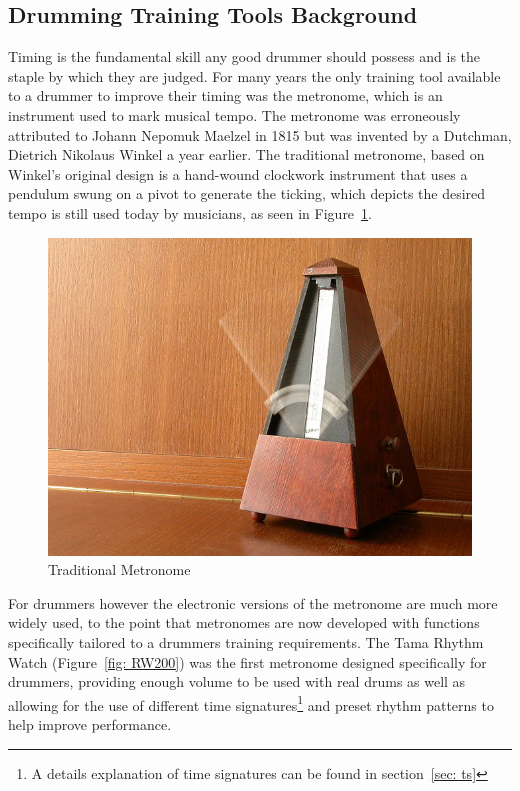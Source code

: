 \documentclass[a4paper, 11pt]{article}
\begin{document}
\subsection{Drumming Training Tools Background}
Timing is the fundamental skill any good drummer should possess and is the staple by which they are judged. For many years the only training tool available to a drummer to improve their timing was the metronome, which is an instrument used to mark musical tempo. The metronome was erroneously attributed to Johann Nepomuk Maelzel in 1815 but was invented by a Dutchman, Dietrich Nikolaus Winkel a year earlier. The traditional metronome, based on Winkel's original design is a hand-wound clockwork instrument that uses a pendulum swung on a pivot to generate the ticking, which depicts the desired tempo \cite{brit-metro} is still used today by musicians, as seen in Figure~\ref{fig: TradMet}. \par

\begin{figure}[ht]
	\centering
	\includegraphics[scale=0.25]{TradMet}
	\caption{Traditional Metronome}%
	\label{fig: TradMet}
\end{figure}

For drummers however the electronic versions of the metronome are much more widely used, to the point that metronomes are now developed with functions specifically tailored to a drummers training requirements. The Tama Rhythm Watch (Figure~\ref{fig: RW200}) was the first metronome designed specifically for drummers, providing enough volume to be used with real drums as well as allowing for the use of different time signatures\footnote{A details explanation of time signatures can be found in section~\ref{sec: ts}} and preset rhythm patterns to help improve performance.\par
\end{document}
